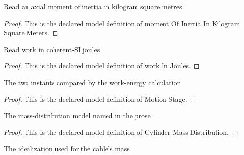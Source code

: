 \begin{definition}
  \label{def:physics:phyx-mini-0820:phyxminiproblems-problemphyxmini0820-momentofinertiainkilogramsquaremeters}
  Read an axial moment of inertia in kilogram square metres
\end{definition}
\begin{proof}
  This is the declared model definition of moment Of Inertia In Kilogram Square Meters.
\end{proof}
\begin{definition}
  \label{def:physics:phyx-mini-0820:phyxminiproblems-problemphyxmini0820-workinjoules}
  Read work in coherent-SI joules
\end{definition}
\begin{proof}
  This is the declared model definition of work In Joules.
\end{proof}
\begin{definition}
  \label{def:physics:phyx-mini-0820:phyxminiproblems-problemphyxmini0820-motionstage}
  The two instants compared by the work-energy calculation
\end{definition}
\begin{proof}
  This is the declared model definition of Motion Stage.
\end{proof}
\begin{definition}
  \label{def:physics:phyx-mini-0820:phyxminiproblems-problemphyxmini0820-cylindermassdistribution}
  The mass-distribution model named in the prose
\end{definition}
\begin{proof}
  This is the declared model definition of Cylinder Mass Distribution.
\end{proof}
\begin{definition}
  \label{def:physics:phyx-mini-0820:phyxminiproblems-problemphyxmini0820-cablemassmodel}
  The idealization used for the cable's mass
\end{definition}
